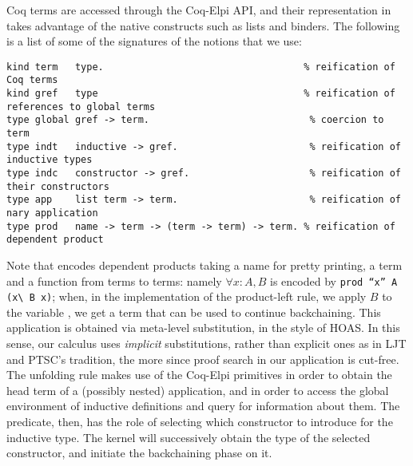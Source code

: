 Coq terms are accessed through the Coq-Elpi API, and their representation
in \lP takes advantage of the native \lP constructs such as lists and binders.
The following is a list of some of the signatures of the notions that we use:
\begin{lstlisting}
kind term   type.                                   % reification of Coq terms
kind gref   type                                    % reification of references to global terms
type global gref -> term.                            % coercion to term
type indt   inductive -> gref.                       % reification of inductive types
type indc   constructor -> gref.                     % reification of their constructors 
type app    list term -> term.                       % reification of nary application
type prod   name -> term -> (term -> term) -> term. % reification of dependent product
\end{lstlisting}

Note that  encodes dependent products taking a name for pretty
printing, a term and a \lP function from terms to terms: namely $\forall x :
A, B$ is encoded by \texttt{prod ``x'' A (x\textbackslash{} B x)}; when, in the
implementation of the product-left rule, we apply $B$ to the variable
, we get a term that can be used to continue backchaining. This
application is obtained via meta-level substitution, in the style of HOAS. In
this sense, our calculus uses \emph{implicit} substitutions, rather than
explicit ones as in LJT and PTSC's tradition, the more since proof search in
our application is cut-free.
The unfolding rule makes use of the Coq-Elpi primitives
 in order to obtain the head term of a (possibly
nested) application, and  in order to access the global
environment of inductive definitions and query for information about them.
The  predicate, then, has the role of selecting which
constructor to introduce for the inductive type. The kernel will successively
obtain the type of the selected constructor, and initiate the backchaining
phase on it.

